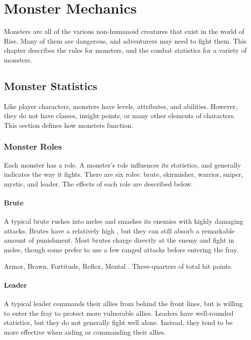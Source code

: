 \chapter{Monster Mechanics}

Monsters are all of the various non-humanoid creatures that exist in the world of Rise.
Many of them are dangerous, and adventurers may need to fight them.
This chapter describes the rules for monsters, and the combat statistics for a variety of monsters.

\section{Monster Statistics}
  Like player characters, monsters have levels, attributes, and abilities.
  However, they do not have classes, insight points, or many other elements of characters.
  This section defines how monsters function.

  \subsection{Monster Roles}
    Each monster has a role.
    A monster's role influences its statistics, and generally indicates the way it fights.
    There are six roles: brute, skirmisher, warrior, sniper, mystic, and leader.
    The effects of each role are described below.

    \subsubsection{Brute}
      A typical brute rushes into melee and smashes its enemies with highly damaging attacks.
      Brutes have a relatively high , but they can still absorb a remarkable amount of punishment.
      Most brutes charge directly at the enemy and fight in melee, though some prefer to use a few ranged attacks before entering the fray.

        Armor,  Brawn,  Fortitude,  Reflex,  Mental
       .
       Three-quarters of total hit points.

    \subsubsection{Leader}
      A typical leader commands their allies from behind the front lines, but is willing to enter the fray to protect more vulnerable allies.
      Leaders have well-rounded statistics, but they do not generally fight well alone.
      Instead, they tend to be more effective when aiding or commanding their allies.

